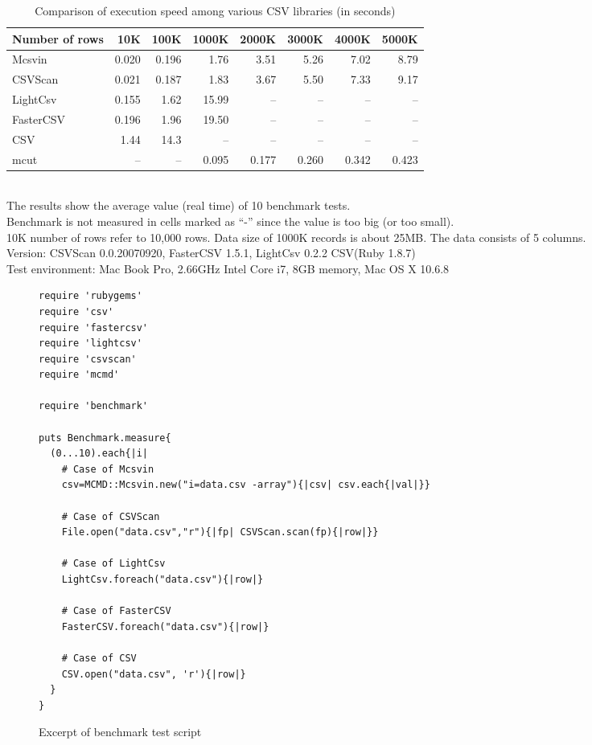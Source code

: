 \begin{table}[htpb]
\begin{center}
\caption{Comparison of execution speed among various CSV libraries (in seconds)
 \label{tb:mcsvinRB_bench1}}
\begin{tabular}{l|r|r|r|r|r|r|r}
\hline
Number of rows      & 10K   & 100K  & 1000K & 2000K& 3000K & 4000K & 5000K\\ \hline
Mcsvin    & 0.020 & 0.196 & 1.76  & 3.51 & 5.26  & 7.02  & 8.79 \\
CSVScan   & 0.021 & 0.187 & 1.83  & 3.67 & 5.50  & 7.33  & 9.17 \\
LightCsv  & 0.155 & 1.62  & 15.99 & --   &    -- & --    & --   \\
FasterCSV & 0.196 & 1.96  & 19.50 & --   &    -- & --    & --   \\
CSV       & 1.44  & 14.3  &  --   & --   &    -- & --    & --   \\
mcut      & --    & --    & 0.095 & 0.177& 0.260 & 0.342 & 0.423\\
\hline
\end{tabular}  
{\small
\\The results show the average value (real time) of 10 benchmark tests. \\
Benchmark is not measured in cells marked as “-” since the value is too big (or too small).\\
10K number of rows refer to 10,000 rows. Data size of 1000K records is about 25MB. The data consists of 5 columns. \\
Version: CSVScan 0.0.20070920, FasterCSV 1.5.1, LightCsv 0.2.2  CSV(Ruby 1.8.7)\\
Test environment: Mac Book Pro, 2.66GHz Intel Core i7, 8GB memory, Mac OS X 10.6.8
}
\end{center}
\end{table}  

\begin{figure}[htpb]
{\small
\begin{Verbatim}[baselinestretch=0.7,frame=single]
require 'rubygems'
require 'csv'
require 'fastercsv'
require 'lightcsv'
require 'csvscan'
require 'mcmd'

require 'benchmark'

puts Benchmark.measure{
  (0...10).each{|i|
    # Case of Mcsvin
    csv=MCMD::Mcsvin.new("i=data.csv -array"){|csv| csv.each{|val|}}

    # Case of CSVScan
    File.open("data.csv","r"){|fp| CSVScan.scan(fp){|row|}}

    # Case of LightCsv
    LightCsv.foreach("data.csv"){|row|}

    # Case of FasterCSV
    FasterCSV.foreach("data.csv"){|row|}

    # Case of CSV
    CSV.open("data.csv", 'r'){|row|}
  }
}
\end{Verbatim}
}
\caption{Excerpt of benchmark test script \label{fig:mcsvinRB_script}}
\end{figure}

